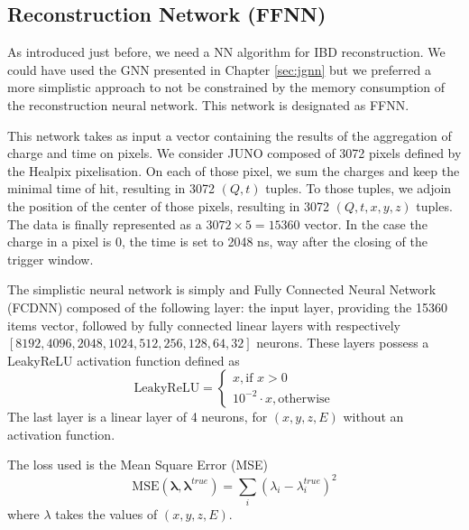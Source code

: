 \documentclass[../main.tex]{subfiles}
\begin{document}
\subsection{Reconstruction Network (FFNN)}
\label{sec:janne:arch:reco}

As introduced just before, we need a NN algorithm for IBD reconstruction. We could have used the GNN presented in Chapter \ref{sec:jgnn} but we preferred a more simplistic approach to not be constrained by the memory consumption of the reconstruction neural network. This network is designated as FFNN.

This network takes as input a vector containing the results of the aggregation of charge and time on pixels. We consider JUNO composed of 3072 pixels defined by the Healpix \cite{gorski_healpix_2005} pixelisation. On each of those pixel, we sum the charges and keep the minimal time of hit, resulting in 3072 $(Q, t)$ tuples. To those tuples, we adjoin the position of the center of those pixels, resulting in 3072 $(Q, t, x, y, z)$ tuples. The data is finally represented as a $3072 \times 5 = 15360$ vector. In the case the charge in a pixel is 0, the time is set to 2048 ns, way after the closing of the trigger window.

The simplistic neural network is simply and Fully Connected Neural Network (FCDNN) composed of the following layer: the input layer, providing the 15360 items vector, followed by fully connected linear layers with respectively $[8192, 4096, 2048, 1024, 512, 256, 128, 64, 32]$ neurons. These layers possess a LeakyReLU activation function defined as
\begin{equation}
  \mathrm{LeakyReLU} = \begin{cases}
    x, \text{if } x > 0 \\
    10^{-2} \cdot x, \text{otherwise}
  \end{cases}
\end{equation}
The last layer is a linear layer of 4 neurons, for $(x, y, z, E)$ without an activation function.

The loss used is the Mean Square Error (MSE)
\begin{equation}
  \text{MSE}(\bm{\lambda}, \bm{\lambda}^{true}) = \sum_i (\lambda_i - \lambda_i^{true})^2
\end{equation}
where $\lambda$ takes the values of $(x, y, z, E)$.
\end{document}

